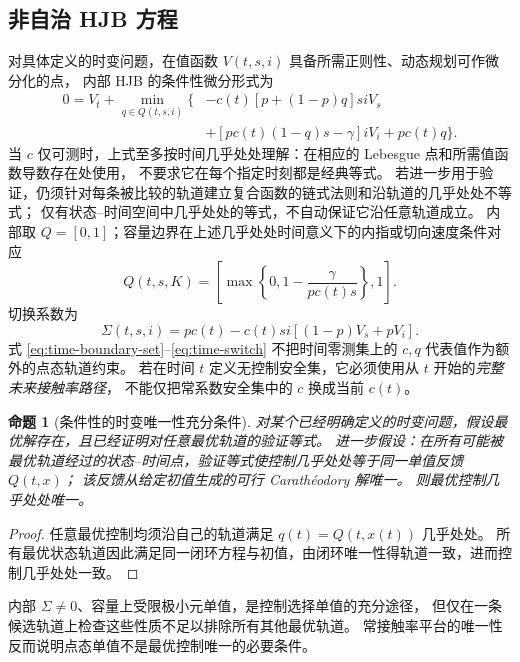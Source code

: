 \documentclass[11pt,a4paper,UTF8]{ctexart}
\newtheorem{proposition}[theorem]{命题}
\theoremstyle{definition}
\begin{document}
\subsection{非自治 HJB 方程}
对具体定义的时变问题，在值函数 $V(t,s,i)$ 具备所需正则性、动态规划可作微分化的点，
内部 HJB 的条件性微分形式为
\begin{equation}
\begin{aligned}
0=V_t+\min_{q\in Q(t,s,i)}\Big\{&-c(t)[p+(1-p)q]siV_s\\
&+[pc(t)(1-q)s-\gamma]iV_i+pc(t)q\Big\}.
\end{aligned}
\label{eq:time-HJB}
\end{equation}
当 $c$ 仅可测时，上式至多按时间几乎处处理解：在相应的 Lebesgue 点和所需值函数导数存在处使用，
不要求它在每个指定时刻都是经典等式。
若进一步用于验证，仍须针对每条被比较的轨道建立复合函数的链式法则和沿轨道的几乎处处不等式；
仅有状态--时间空间中几乎处处的等式，不自动保证它沿任意轨道成立。
内部取 $Q=[0,1]$；容量边界在上述几乎处处时间意义下的内指或切向速度条件对应
\begin{equation}
Q(t,s,K)=\left[\max\left\{0,1-\frac{\gamma}{pc(t)s}\right\},1\right].
\label{eq:time-boundary-set}
\end{equation}
切换系数为
\begin{equation}
\Sigma(t,s,i)=pc(t)-c(t)si[(1-p)V_s+pV_i].
\label{eq:time-switch}
\end{equation}
式 \eqref{eq:time-boundary-set}--\eqref{eq:time-switch} 不把时间零测集上的 $c,q$ 代表值作为额外的点态轨道约束。
若在时间 $t$ 定义无控制安全集，它必须使用从 $t$ 开始的\emph{完整未来接触率路径}，
不能仅把常系数安全集中的 $c$ 换成当前 $c(t)$。

\begin{proposition}[条件性的时变唯一性充分条件]
\label{prop:time-conditional}
对某个已经明确定义的时变问题，假设最优解存在，且已经证明对任意最优轨道的验证等式。
进一步假设：在所有可能被最优轨道经过的状态--时间点，验证等式使控制几乎处处等于同一单值反馈 $Q(t,x)$；
该反馈从给定初值生成的可行 Carath\'eodory 解唯一。
则最优控制几乎处处唯一。
\end{proposition}
\begin{proof}
任意最优控制均须沿自己的轨道满足 $q(t)=Q(t,x(t))$ 几乎处处。
所有最优状态轨道因此满足同一闭环方程与初值，由闭环唯一性得轨道一致，进而控制几乎处处一致。
\end{proof}
内部 $\Sigma\ne0$、容量上受限极小元单值，是控制选择单值的充分途径，
但仅在一条候选轨道上检查这些性质不足以排除所有其他最优轨道。
常接触率平台的唯一性反而说明点态单值不是最优控制唯一的必要条件。
\end{document}
